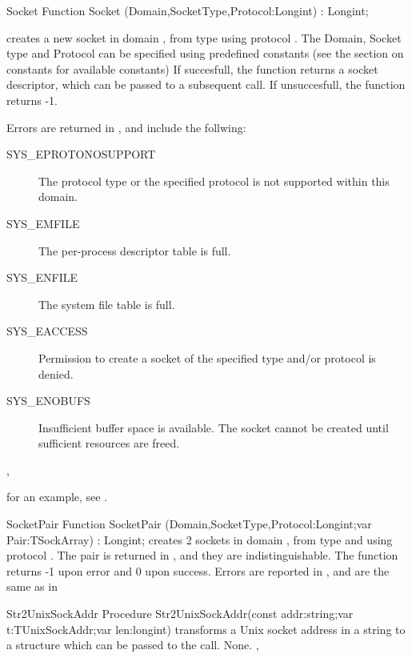 \begin{function}{Socket}
\Declaration
Function Socket (Domain,SocketType,Protocol:Longint) : Longint;

\Description
{} creates a new socket in domain , from type
 using protocol .
The Domain, Socket type and Protocol can be specified using predefined
constants (see the section on constants for available constants)
If succesfull, the function returns a socket descriptor, which can be passed
to a subsequent  call. If unsuccesfull, the function returns -1.

\Errors
Errors are returned in , and include the follwing:
\begin{description}
\item[SYS\_EPROTONOSUPPORT]
The protocol type or the specified protocol is not
supported within this domain.
\item[SYS\_EMFILE]
The per-process descriptor table is full.
\item[SYS\_ENFILE]
The system file table is full.
\item[SYS\_EACCESS]
 Permission  to  create  a  socket of the specified
 type and/or protocol is denied.
\item[SYS\_ENOBUFS]
 Insufficient  buffer  space  is  available.    The
 socket   cannot   be   created   until  sufficient
 resources are freed.
\end{description}
\SeeAlso
{}, 
\end{function}

for an example, see .

\begin{function}{SocketPair}
\Declaration
Function SocketPair (Domain,SocketType,Protocol:Longint;var Pair:TSockArray) : Longint;
\Description
{} creates 2 sockets in domain , from type
 and using protocol .
The pair is returned in , and they are indistinguishable.
The function returns -1 upon error and 0 upon success.
\Errors
Errors are reported in , and are the same as in 
\SeeAlso
{}
\end{function}

\begin{procedure}{Str2UnixSockAddr}
\Declaration
Procedure Str2UnixSockAddr(const addr:string;var t:TUnixSockAddr;var len:longint)
\Description
{} transforms a Unix socket address in a string to a
 structure which can be passed to the  call.
\Errors
None.
\SeeAlso
{}, 
\end{procedure}
